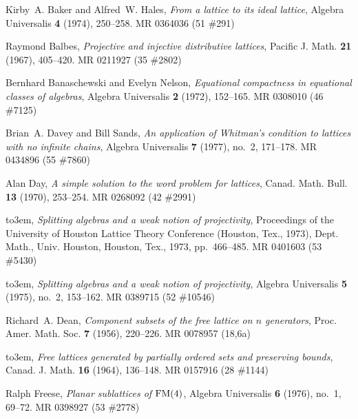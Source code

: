 \documentclass[reqno]{amsart}
\numberwithin{equation}{section}
\theoremstyle{plain}
\theoremstyle{definition}
\theoremstyle{remark}
\numberwithin{figure}{section}
\numberwithin{table}{section}
\begin{document}
\providecommand{\bysame}{\leavevmode\hbox to3em{\hrulefill}\thinspace}
\providecommand{\MR}{\relax\ifhmode\unskip\space\fi MR }
\providecommand{\MRhref}[2]{  \href{http://www.ams.org/mathscinet-getitem?mr=#1}{#2}
}
\providecommand{\href}[2]{#2}
\begin{thebibliography}{10}

Kirby~A. Baker and Alfred~W. Hales, \emph{From a lattice to its ideal lattice},
  Algebra Universalis \textbf{4} (1974), 250--258. \MR{0364036 (51 \#291)}

Raymond Balbes, \emph{Projective and injective distributive lattices}, Pacific
  J. Math. \textbf{21} (1967), 405--420. \MR{0211927 (35 \#2802)}

Bernhard Banaschewski and Evelyn Nelson, \emph{Equational compactness in
  equational classes of algebras}, Algebra Universalis \textbf{2} (1972),
  152--165. \MR{0308010 (46 \#7125)}

Brian~A. Davey and Bill Sands, \emph{An application of {W}hitman's condition to
  lattices with no infinite chains}, Algebra Universalis \textbf{7} (1977),
  no.~2, 171--178. \MR{0434896 (55 \#7860)}

Alan Day, \emph{A simple solution to the word problem for lattices}, Canad.
  Math. Bull. \textbf{13} (1970), 253--254. \MR{0268092 (42 \#2991)}

\bysame, \emph{Splitting algebras and a weak notion of projectivity},
  Proceedings of the {U}niversity of {H}ouston {L}attice {T}heory {C}onference
  ({H}ouston, {T}ex., 1973), Dept. Math., Univ. Houston, Houston, Tex., 1973,
  pp.~466--485. \MR{0401603 (53 \#5430)}

\bysame, \emph{Splitting algebras and a weak notion of projectivity}, Algebra
  Universalis \textbf{5} (1975), no.~2, 153--162. \MR{0389715 (52 \#10546)}

Richard~A. Dean, \emph{Component subsets of the free lattice on {$n$}
  generators}, Proc. Amer. Math. Soc. \textbf{7} (1956), 220--226. \MR{0078957
  (18,6a)}

\bysame, \emph{Free lattices generated by partially ordered sets and preserving
  bounds}, Canad. J. Math. \textbf{16} (1964), 136--148. \MR{0157916 (28
  \#1144)}

Ralph Freese, \emph{Planar sublattices of {${\rm FM}(4)$}}, Algebra Universalis
  \textbf{6} (1976), no.~1, 69--72. \MR{0398927 (53 \#2778)}


\end{thebibliography}
\end{document}
